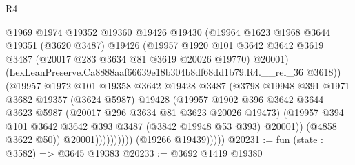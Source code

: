 \begin{lexlean}{R4}
\begin{coremodule}
                              @1969
                              @1974
                              @19352
                              @19360
                              @19426
                              @19430
                              (@19964
                                @1623
                                @1968
                                @3644
                                @19351
                                (@3620 @3487)
                                @19426
                                (@19957
                                  @1920
                                  @101
                                  @3642
                                  @3642
                                  @3619
                                  @3487
                                  (@20017 @283 @3634 @81 @3619 @20026 @19770)
                                  @20001)
                                (LexLeanPreserve.Ca8888aaf66639e18b304b8df68dd1b79.R4.__rel_36
                                  @3618))
                              (@19957
                                @1972
                                @101
                                @19358
                                @3642
                                @19428
                                @3487
                                (@3798
                                  @19948
                                  @391
                                  @1971
                                  @3682
                                  @19357
                                  (@3624 @5987)
                                  @19428
                                  (@19957
                                    @1902
                                    @396
                                    @3642
                                    @3644
                                    @3623
                                    @5987
                                    (@20017 @296 @3634 @81 @3623 @20026 @19473)
                                    (@19957
                                      @394
                                      @101
                                      @3642
                                      @3642
                                      @393
                                      @3487
                                      (@3842 @19948 @53 @393)
                                      @20001))
                                  (@4858 @3622 @50))
                                @20001))))))))))
            (@19266 @19439)))))
@20231 := fun (state : @3582) => @3645 @19383
@20233 := @3692 @1419 @19380

\end{coremodule}
\end{lexlean}
